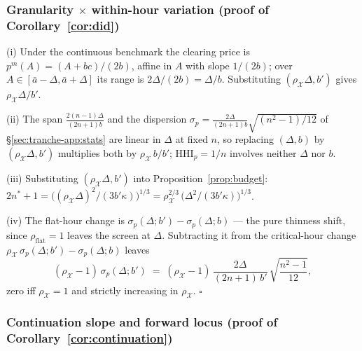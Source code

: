 \documentclass[11pt,a4paper]{article}
\theoremstyle{definition}
\theoremstyle{remark}
\theoremstyle{plain}
\begin{document}
\subsubsection{Granularity $\times$ within-hour variation (proof of Corollary~\ref{cor:did})}\label{sec:tranche-app:did}

(i) Under the continuous benchmark the clearing price is $p^m(A) = (A + bc)/(2b)$, affine in $A$ with slope $1/(2b)$; over $A \in [\bar a - \Delta, \bar a + \Delta]$ its range is $2\Delta/(2b) = \Delta/b$. Substituting $(\rho_{\mathcal X}\Delta, b')$ gives $\rho_{\mathcal X}\Delta/b'$.

(ii) The span $\tfrac{2(n-1)\Delta}{(2n+1) b}$ and the dispersion $\sigma_p = \tfrac{2\Delta}{(2n+1) b}\sqrt{(n^2-1)/12}$ of \S\ref{sec:tranche-app:stats} are linear in $\Delta$ at fixed $n$, so replacing $(\Delta, b)$ by $(\rho_{\mathcal X}\Delta, b')$ multiplies both by $\rho_{\mathcal X}\,b/b'$; $\text{HHI}_p = 1/n$ involves neither $\Delta$ nor $b$.

(iii) Substituting $(\rho_{\mathcal X}\Delta, b')$ into Proposition~\ref{prop:budget}: $2n^*+1 = \bigl((\rho_{\mathcal X}\Delta)^2/(3 b' \kappa)\bigr)^{1/3} = \rho_{\mathcal X}^{2/3}\,\bigl(\Delta^2/(3 b' \kappa)\bigr)^{1/3}$.

(iv) The flat-hour change is $\sigma_p(\Delta; b') - \sigma_p(\Delta; b)$ --- the pure thinness shift, since $\rho_{\text{flat}} = 1$ leaves the screen at $\Delta$. Subtracting it from the critical-hour change $\rho_{\mathcal X}\,\sigma_p(\Delta; b') - \sigma_p(\Delta; b)$ leaves
\[
(\rho_{\mathcal X} - 1)\,\sigma_p(\Delta; b') \;=\; (\rho_{\mathcal X} - 1)\,\frac{2\Delta}{(2n+1)\,b'}\,\sqrt{\frac{n^2-1}{12}},
\]
zero iff $\rho_{\mathcal X} = 1$ and strictly increasing in $\rho_{\mathcal X}$. $\square$

\subsubsection{Continuation slope and forward locus (proof of Corollary~\ref{cor:continuation})}\label{sec:tranche-app:continuation}
\end{document}
